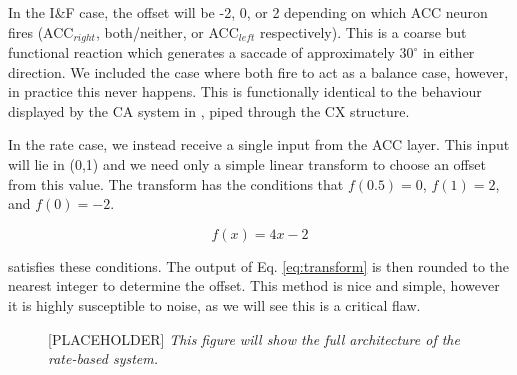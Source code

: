 \documentclass[a4paper,11pt,twoside,openright]{article}
\begin{document}
In the I\&F case, the offset will be -2, 0, or 2 depending on which
ACC neuron fires (ACC$_{right}$, both/neither, or ACC$_{left}$
respectively). This is a coarse but functional reaction which
generates a saccade of approximately $30^{\circ}$ in either
direction. We included the case where both fire to act as a balance
case, however, in practice this never happens. This is functionally
identical to the behaviour displayed by the CA system in
\cite{Mitchell2018}, piped through the CX structure.
\newline\par

In the rate case, we instead receive a single input from the ACC layer.
This input will lie in (0,1) and we need only a simple linear transform to
choose an offset from this value. The transform has the conditions that
$f(0.5) = 0$, $f(1) = 2$, and $f(0) = -2$.

\begin{equation}
  \label{eq:transform}
 f(x) = 4x - 2
\end{equation}

satisfies these conditions. The output of Eq. \ref{eq:transform} is then rounded
to the nearest integer to determine the offset. This method is nice and simple,
however it is highly susceptible to noise, as we will see this is a critical
flaw.

\begin{figure}[h!]
  \caption{\label{fig:mrspRateArrangement}[PLACEHOLDER] \textit{This
      figure will show the full architecture of the rate-based system.}}
\end{figure}
\end{document}
